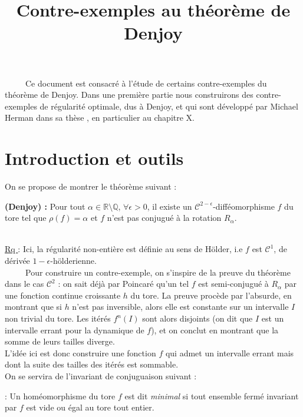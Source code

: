 \documentclass[11pt,a4paper]{article}
\title{\textbf{Contre-exemples au théorème de Denjoy }}
\date{}
\begin{document}
\maketitle

\ \ \ \ \ Ce document est consacré à l'étude de certains contre-exemples du théorème de Denjoy. Dans une première partie nous construirons des contre-exemples de régularité optimale, dus à Denjoy, et qui sont développé par Michael Herman dans sa thèse \cite{herman}, en particulier au chapitre X. 
\section{Introduction et outils}

On se propose de montrer le théorème suivant :

\begin{theorem}\textbf{(Denjoy) : }
Pour tout $\alpha \in \mathbb{R} \setminus \mathbb{Q}$, $\forall \epsilon > 0$, il existe un $\mathcal{C}^{2-\epsilon}$-difféomorphisme $f$ du tore tel que $\rho(f)=\alpha$ et $f$ n'est pas conjugué à la rotation $R_\alpha$.
\end{theorem}

~\\
\underline{Rq }: Ici, la  régularité non-entière est définie au sens de Hölder, i.e $f$ est $\mathcal{C}^1$, de dérivée $1-\epsilon$-hölderienne.\\

\ \ \ \ \ Pour construire un contre-exemple, on s'inspire de la preuve du théorème dans le cas $\mathcal{C}^2$ : on sait déjà par Poincaré qu'un tel $f$ est semi-conjugué à $R_\alpha$ par une fonction continue croissante $h$ du tore. La preuve procède par l'absurde, en montrant que si $h$ n'est pas inversible, alors elle est constante sur un intervalle $I$ non trivial du tore. Les itérés $f^n(I)$ sont alors disjoints (on dit que $I$ est un intervalle errant pour la dynamique de $f$), et on conclut en montrant que la somme de leurs tailles diverge. \\ 
L'idée ici est donc construire une fonction $f$ qui admet un intervalle errant mais dont la suite des tailles des itérés est sommable. \\

On se servira de l'invariant de conjuguaison suivant : 

\begin{defin} : Un homéomorphisme du tore $f$ est dit \textit{minimal} si tout ensemble fermé invariant par  $f$ est vide ou égal au tore tout entier. 
\end{defin}
\end{document}
